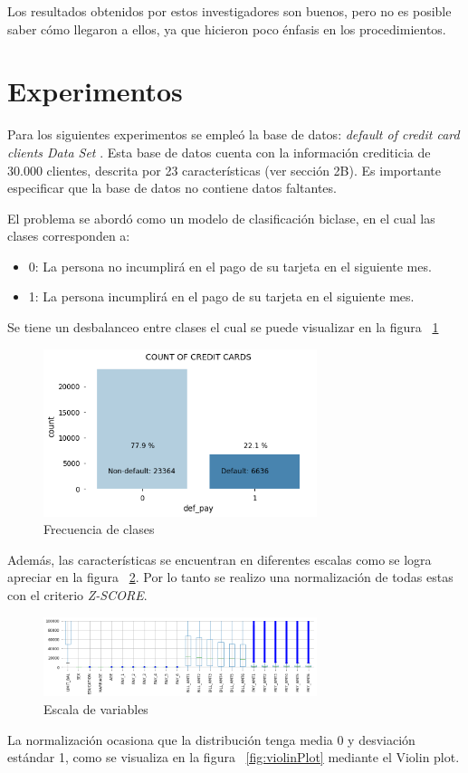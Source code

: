 \documentclass[conference]{IEEEtran}
\begin{document}
 Los resultados obtenidos por estos investigadores son buenos, pero no es posible saber cómo llegaron a ellos, ya que hicieron poco énfasis en los procedimientos.

\section{Experimentos}
  Para los siguientes experimentos se empleó la base de datos: \textit{default of credit card clients Data Set} \cite{bd}. Esta base de datos cuenta con la información crediticia de 30.000 clientes, descrita por  23 características (ver sección 2B). Es importante especificar que la base de datos no contiene datos faltantes.

El problema se abordó como un modelo de clasificación biclase, en el cual las clases corresponden a: 

\begin{itemize}
\item 0: La persona no incumplirá en el pago de su tarjeta en el siguiente mes.
\item 1: La persona incumplirá en el pago de su tarjeta en el siguiente mes.
\end{itemize}
Se tiene un desbalanceo entre clases el cual se puede visualizar en la figura ~\ref{fig:frecuenciaClases}
\begin{center}
    \begin{figure}[H]
        \hfill
            \includegraphics[width=8cm]{desbalnaceo.png}\hspace*{\fill}
    \caption{Frecuencia de clases}
    \label{fig:frecuenciaClases}
    \end{figure}  
\end{center}
Además, las características se encuentran en diferentes escalas como se logra apreciar en la figura ~\ref{fig:escalaVariables}. Por lo tanto se realizo una normalización de todas estas con el criterio \textit{Z-SCORE}. 
\begin{center}
    \begin{figure}[H]
        \hfill
            \includegraphics[width=8cm]{escala.png}\hspace*{\fill}
    \caption{Escala de variables}
    \label{fig:escalaVariables}
    \end{figure}  
\end{center}
La normalización ocasiona que la distribución tenga media 0 y desviación estándar 1, como se visualiza en la figura ~\ref{fig:violinPlot} mediante el Violin plot.
\end{document}
